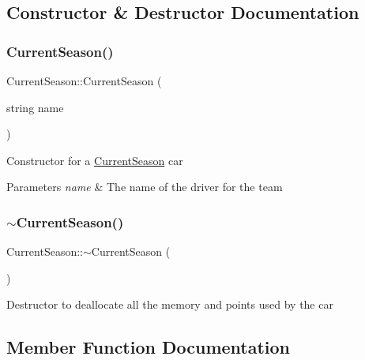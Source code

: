 \subsection{Constructor \& Destructor Documentation}
\mbox{\label{classCurrentSeason_a65af23c148bf8745199232459753955f}} 
\subsubsection{\texorpdfstring{Current\+Season()}{CurrentSeason()}}
{\footnotesize\ttfamily Current\+Season\+::\+Current\+Season (\begin{DoxyParamCaption}\item[{string}]{name }\end{DoxyParamCaption})}

Constructor for a \hyperlink{classCurrentSeason}{Current\+Season} car 
\begin{DoxyParams}{Parameters}
{\em name} & The name of the driver for the team \\
\hline
\end{DoxyParams}
\mbox{\label{classCurrentSeason_a5f5b214667194da480939a33ada4efae}} 
\subsubsection{\texorpdfstring{$\sim$\+Current\+Season()}{~CurrentSeason()}}
{\footnotesize\ttfamily Current\+Season\+::$\sim$\+Current\+Season (\begin{DoxyParamCaption}{ }\end{DoxyParamCaption})}

Destructor to deallocate all the memory and points used by the car 

\subsection{Member Function Documentation}
\mbox{\label{classCurrentSeason_a2ae9598222bc7aba71040775c019f297}} 
